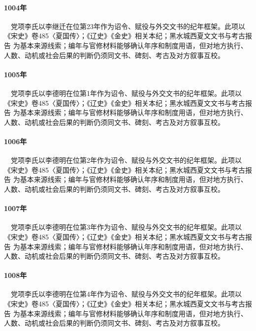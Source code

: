 \paragraph{1004年}　党项李氏以李继迁在位第23年作为诏令、赋役与外交文书的纪年框架。此项以《宋史》卷485〈夏国传〉；《辽史》《金史》相关本纪；黑水城西夏文文书与考古报告 为基本来源线索；编年与官修材料能够确认年序和制度用语，但对地方执行、人数、动机或社会后果的判断仍须同文书、碑刻、考古及对方叙事互校。

\paragraph{1005年}　党项李氏以李德明在位第1年作为诏令、赋役与外交文书的纪年框架。此项以《宋史》卷485〈夏国传〉；《辽史》《金史》相关本纪；黑水城西夏文文书与考古报告 为基本来源线索；编年与官修材料能够确认年序和制度用语，但对地方执行、人数、动机或社会后果的判断仍须同文书、碑刻、考古及对方叙事互校。

\paragraph{1006年}　党项李氏以李德明在位第2年作为诏令、赋役与外交文书的纪年框架。此项以《宋史》卷485〈夏国传〉；《辽史》《金史》相关本纪；黑水城西夏文文书与考古报告 为基本来源线索；编年与官修材料能够确认年序和制度用语，但对地方执行、人数、动机或社会后果的判断仍须同文书、碑刻、考古及对方叙事互校。

\paragraph{1007年}　党项李氏以李德明在位第3年作为诏令、赋役与外交文书的纪年框架。此项以《宋史》卷485〈夏国传〉；《辽史》《金史》相关本纪；黑水城西夏文文书与考古报告 为基本来源线索；编年与官修材料能够确认年序和制度用语，但对地方执行、人数、动机或社会后果的判断仍须同文书、碑刻、考古及对方叙事互校。

\paragraph{1008年}　党项李氏以李德明在位第4年作为诏令、赋役与外交文书的纪年框架。此项以《宋史》卷485〈夏国传〉；《辽史》《金史》相关本纪；黑水城西夏文文书与考古报告 为基本来源线索；编年与官修材料能够确认年序和制度用语，但对地方执行、人数、动机或社会后果的判断仍须同文书、碑刻、考古及对方叙事互校。

